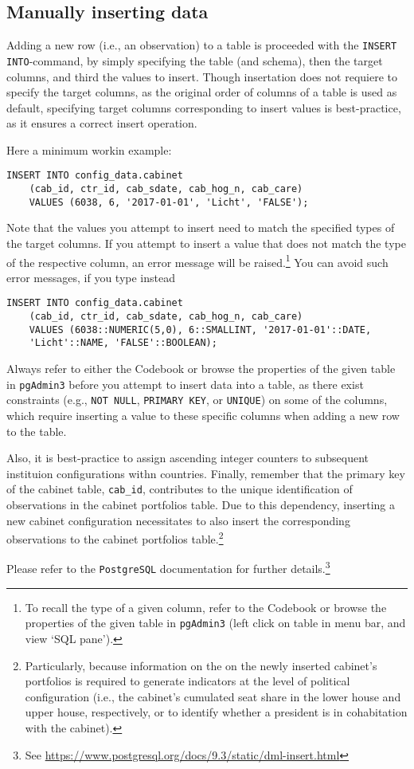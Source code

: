 \subsection{Manually inserting data}\label{subsec_manually_inserting_data}

Adding a new row (i.e., an observation) to a table is proceeded with the \texttt{INSERT INTO}-command, by simply specifying the table (and schema), then the target columns, and third the values to insert.
Though insertation does not requiere to specify the target columns, as the original order of columns of a table is used as default, specifying target columns corresponding to insert values is best-practice, as it ensures a correct insert operation.

Here a minimum workin example:

\begin{lstlisting}[language=postgreSQL]
INSERT INTO config_data.cabinet
	(cab_id, ctr_id, cab_sdate, cab_hog_n, cab_care)
	VALUES (6038, 6, '2017-01-01', 'Licht', 'FALSE');
\end{lstlisting}

Note that the values you attempt to insert need to match the specified types of the target columns. 
If you attempt to insert a value that does not match the type of the respective column, an error message will be raised.\footnote{%
To recall the type of a given column, refer to the Codebook or browse the properties of the given table in \texttt{pgAdmin3} (left click on table in menu bar, and view `SQL pane').}
You can avoid such error messages, if you type instead 

\begin{lstlisting}[language=postgreSQL]
INSERT INTO config_data.cabinet
	(cab_id, ctr_id, cab_sdate, cab_hog_n, cab_care)
	VALUES (6038::NUMERIC(5,0), 6::SMALLINT, '2017-01-01'::DATE, 
    'Licht'::NAME, 'FALSE'::BOOLEAN);
\end{lstlisting}

Always refer to either the Codebook or browse the properties of the given table in \texttt{pgAdmin3} before you attempt to insert data into a table, as there exist constraints (e.g., \texttt{NOT NULL}, \texttt{PRIMARY KEY}, or \texttt{UNIQUE}) on some of the columns, which require inserting a value to these specific columns when adding a new row to the table.

Also, it is best-practice to assign ascending integer counters  to subsequent instituion configurations withn countries.
Finally, remember that the primary key of the cabinet table, \texttt{cab\_id}, contributes to the unique identification of observations in the cabinet portfolios table. 
Due to this dependency, inserting a new cabinet configuration necessitates to also insert the corresponding observations to the cabinet portfolios table.\footnote{%
Particularly, because information on the on the newly inserted cabinet's portfolios is required to generate indicators at the level of political configuration (i.e., the cabinet's cumulated seat share in the lower house and upper house, respectively, or to identify whether a president is in cohabitation with the cabinet).}

Please refer to the \texttt{PostgreSQL} documentation for further details.\footnote{See \url{https://www.postgresql.org/docs/9.3/static/dml-insert.html}}
